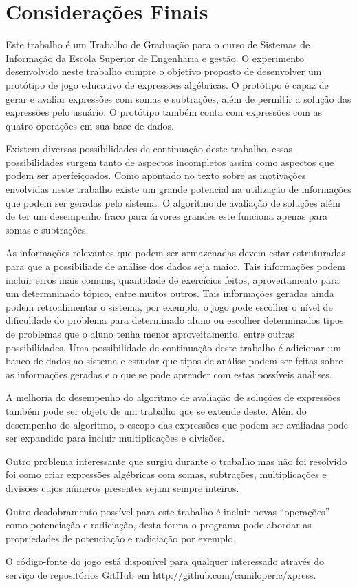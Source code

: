 \part{Considerações Finais}
Este trabalho é um Trabalho de Graduação para o curso de Sistemas de Informação da Escola Superior de Engenharia e gestão. O experimento desenvolvido neste trabalho cumpre o objetivo proposto de desenvolver um protótipo de jogo educativo de expressões algébricas. O protótipo é capaz de gerar e avaliar expressões com somas e subtrações, além de permitir a solução das expressões pelo usuário. O protótipo também conta com expressões com as quatro operações em sua base de dados.

Existem diversas possibilidades de continuação deste trabalho, essas possibilidades surgem tanto de aspectos incompletos assim como aspectos que podem ser aperfeiçoados. Como apontado no texto sobre as motivações envolvidas neste trabalho existe um grande potencial na utilização de informações que podem ser geradas pelo sistema. O algoritmo de avaliação de soluções além de ter um desempenho fraco para árvores grandes este funciona apenas para somas e subtrações.

 	As informações relevantes que podem ser armazenadas devem estar estruturadas para que a possibiliade de análise dos dados seja maior. Tais informações podem incluir erros mais comuns, quantidade de exercícios feitos, aproveitamento para um determninado tópico, entre muitos outros. Tais informações geradas ainda podem retroalimentar o sistema, por exemplo, o jogo pode escolher o  nível de dificuldade do problema para determinado aluno ou escolher determinados tipos de problemas que o aluno tenha menor aproveitamento, entre outras possibilidades. %
Uma possibilidade de continuação deste trabalho é adicionar um banco de dados ao sistema e estudar que tipos de análise podem ser feitas sobre as informações geradas e o que se pode aprender com estas possíveis análises.

A melhoria do desempenho do algoritmo de avaliação de soluções de expressões também pode ser objeto de um trabalho que se extende deste. Além do desempenho do algoritmo, o escopo das expressões que podem ser avaliadas pode ser expandido para incluir multiplicações e divisões.

Outro problema interessante que surgiu durante o trabalho mas não foi resolvido foi como criar expressões algébricas com somas, subtrações, multiplicações e divisões cujos números presentes sejam sempre inteiros.

Outro desdobramento possível para este trabalho é incluir novas “operações” como potenciação e radiciação, desta forma o programa pode abordar as propriedades de potenciação e radiciação por exemplo.

O código-fonte do jogo está disponível para qualquer interessado através do serviço de repositórios GitHub em http://github.com/camiloperic/xpress.
